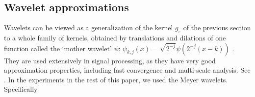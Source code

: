 \subsection{Wavelet approximations}
\label{sec:waveletApx}

Wavelets can be viewed as a generalization of the kernel $g_\varepsilon$ of the previous section to a whole family of kernels, obtained by translations and dilations of one function called the `mother wavelet' $\psi$: $\psi_{k,j}(x) = \sqrt{2^{-j}}\psi(2^{-j}(x-k))$  \cite{MallatBook}.
They are used extensively in signal processing, as they have very good approximation properties, including fast convergence and multi-scale analysis.
See \cite{MallatBook}.
In the experiments in the rest of this paper, we used the Meyer wavelets. 
Specifically
 
